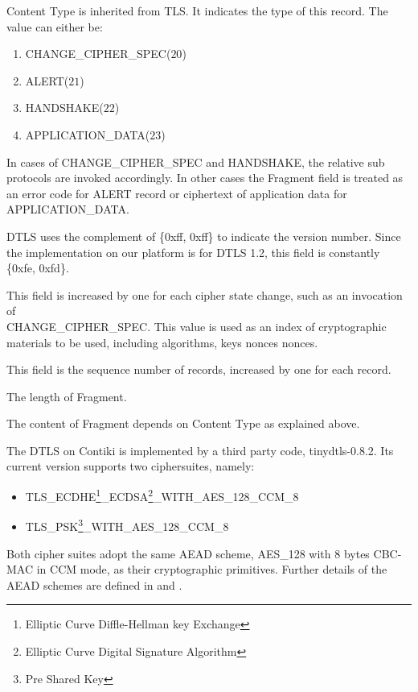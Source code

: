 \begin{description}[style=nextline]
	\item[\textbf{Content Type}]
	Content Type is inherited from TLS. It indicates the type of this record. The value can either be:
	\begin{enumerate}
		\item CHANGE\_CIPHER\_SPEC($20$)
		\item ALERT($21$)
		\item HANDSHAKE($22$)
		\item APPLICATION\_DATA($23$)
	\end{enumerate}
	In cases of CHANGE\_CIPHER\_SPEC and HANDSHAKE, the relative sub protocols are invoked accordingly. In other cases the Fragment field is treated as an error code for ALERT record or ciphertext of application data for APPLICATION\_DATA.
	\item[\textbf{Protocol Version}]
	DTLS uses the complement of \{0xff, 0xff\} to indicate the version number. Since the implementation on our platform is for DTLS 1.2, this field is constantly \{0xfe, 0xfd\}.
	\item[\textbf{Epoch}]
	This field is increased by one for each cipher state change, such as an invocation of \\
	CHANGE\_CIPHER\_SPEC. This value is used as an index of cryptographic materials to be used, including algorithms, keys nonces nonces.
	\item[\textbf{Sequence Number}]
	This field is the sequence number of records, increased by one for each record.
	\item[\textbf{Length}]
	The length of Fragment.
	\item[\textbf{Fragment}]
	The content of Fragment depends on Content Type as explained above.
\end{description}

The DTLS on Contiki is implemented by a third party code, tinydtls-0.8.2\cite{tinydtls}. Its current version supports two ciphersuites, namely:
\begin{itemize}
	\item TLS\_ECDHE\footnote{Elliptic Curve Diffle-Hellman key Exchange}\_ECDSA\footnote{Elliptic Curve Digital Signature Algorithm}\_WITH\_AES\_128\_CCM\_8\cite{rfc7251}
	\item TLS\_PSK\footnote{Pre Shared Key}\_WITH\_AES\_128\_CCM\_8\cite{rfc6655}
\end{itemize}
Both cipher suites adopt the same AEAD scheme, AES\_128 with 8 bytes CBC-MAC in CCM mode, as their cryptographic primitives. Further details of the AEAD schemes are defined in \cite{rfc5116} and \cite{CCM}.

